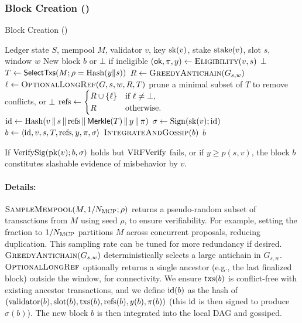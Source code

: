 \subsubsection{Block Creation (\ProjBase)}
\begin{algorithm}[H]
\caption{Block Creation (\ProjBase)}
\label{alg:block-creation}
\begin{algorithmic}[1]
\Require Ledger state $S$, mempool $M$, validator $v$, key $\mathrm{sk}(v)$, stake $\mathrm{stake}(v)$, slot $s$, window $w$
\Ensure New block $b$ or $\bot$ if ineligible
\State $(\mathsf{ok}, \pi, y) \gets \textsc{Eligibility}(v,s)$
 \Return $\bot$ \EndIf
\State $T \gets \mathsf{SelectTxs}(M; \rho = \mathrm{Hash}(y\|s))$
\State $R \gets \textsc{GreedyAntichain}(G_{s,w})$
\State $\ell \gets \textsc{OptionalLongRef}(G, s, w, R, T)$
  \State prune a minimal subset of $T$ to remove conflicts, or \Return $\bot$
\EndIf
\State $\mathrm{refs} \gets 
\begin{cases}
R \cup \{\ell\} & \text{if }\ell\neq\bot,\\
R & \text{otherwise.}
\end{cases}$
\State $\mathrm{id} \gets \mathrm{Hash}(v \,\|\, s \,\|\, \mathrm{refs} \,\|\, \mathsf{Merkle}(T) \,\|\, y \,\|\, \pi)$
\State $\sigma \gets \mathrm{Sign}(\mathrm{sk}(v); \mathrm{id})$
\State $b \gets \langle \mathrm{id}, v, s, T, \mathrm{refs}, y, \pi, \sigma\rangle$
\State $\textsc{IntegrateAndGossip}(b)$
\State \Return $b$
\end{algorithmic}
\end{algorithm}

\begin{remark}
If $\mathrm{VerifySig}(\mathrm{pk}(v); b, \sigma)$ holds but $\mathrm{VRFVerify}$ fails, or if $y \ge p(s,v)$, 
the block $b$ constitutes slashable evidence of misbehavior by $v$. 
\end{remark}


\paragraph{Details:} $\textsc{SampleMempool}(M,1/N_{\mathrm{MCP}};\rho)$ returns a pseudo-random subset of transactions from $M$ using seed $\rho$, to ensure verifiability. For example, setting the fraction to $1/N_{\mathrm{MCP}}$ partitions $M$ across concurrent proposals, reducing duplication. This sampling rate can be tuned for more redundancy if desired. $\textsc{GreedyAntichain}(G_{s,w})$ deterministically selects a large antichain in $G_{s,w}$. $\textsc{OptionalLongRef}$ optionally returns a single ancestor (e.g., the last finalized block) outside the window, for connectivity. We ensure $\mathrm{txs}(b)$ is conflict-free with existing ancestor transactions, and we define $\mathrm{id}(b)$ as the hash of $(\mathrm{validator}(b),\mathrm{slot}(b),\mathrm{txs}(b),\mathrm{refs}(b),y(b),\pi(b))$ (this $\mathrm{id}$ is then signed to produce $\sigma(b)$). The new block $b$ is then integrated into the local DAG and gossiped.

